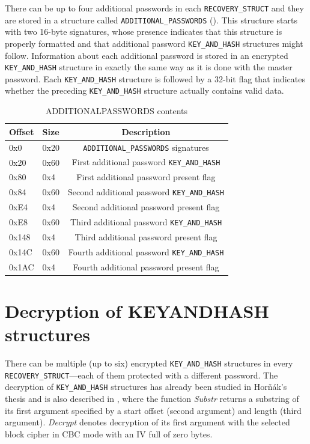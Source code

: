 \documentclass[thesis=B,english]{FITthesis}[2012/10/20]
\begin{document}
	There can be up to four additional passwords in each \verb|RECOVERY_STRUCT| and they are stored in a structure called \verb|ADDITIONAL_PASSWORDS| (). This structure starts with two 16-byte signatures, whose presence indicates that this structure is properly formatted and that additional password \verb|KEY_AND_HASH| structures might follow. Information about each additional password is stored in an encrypted \verb|KEY_AND_HASH| structure in exactly the same way as it is done with the master password. Each \verb|KEY_AND_HASH| structure is followed by a \mbox{32-bit} flag that indicates whether the preceding \verb|KEY_AND_HASH| structure actually contains valid data.
	
	\begin{table}
		\centering
		\begin{tabular}{|l | l | c |} 
			\hline
			Offset & Size & Description \\
			\hline \hline
			0x0 & 0x20 & \verb|ADDITIONAL_PASSWORDS| signatures \\ 
			\hline
			0x20 & 0x60 & First additional password \verb|KEY_AND_HASH| \\ 
			\hline
			0x80 & 0x4  & First additional password present flag \\ 
			\hline
			0x84 & 0x60 & Second additional password \verb|KEY_AND_HASH| \\ 
			\hline
			0xE4 & 0x4 & Second additional password present flag \\ 
			\hline
			0xE8 & 0x60 & Third additional password \verb|KEY_AND_HASH| \\ 
			\hline
			0x148 & 0x4 & Third additional password present flag \\ 
			\hline
			0x14C & 0x60 & Fourth additional password \verb|KEY_AND_HASH| \\ 
			\hline
			0x1AC & 0x4 & Fourth additional password present flag \\ 
			\hline
		\end{tabular}
		\caption{ADDITIONAL\TextUnderscore{}PASSWORDS contents}
		\label{tab:addpass}
	\end{table}
	
	\section{Decryption of KEY\textunderscore{}AND\textunderscore{}HASH structures}
	\label{sec:decrypt}
	
	There can be multiple (up to six) encrypted \verb|KEY_AND_HASH| structures in every \verb|RECOVERY_STRUCT|---each of them protected with a different password. The decryption of \verb|KEY_AND_HASH| structures has already been studied in Hor{\v n}{\' a}k's thesis \cite{hornak} and is also described in , where the function \textit{Substr} returns a substring of its first argument specified by a  start offset (second argument) and length (third argument). \textit{Decrypt} denotes decryption of its first argument with the selected block cipher in CBC mode with an IV full of zero bytes. 
	
\end{document}
